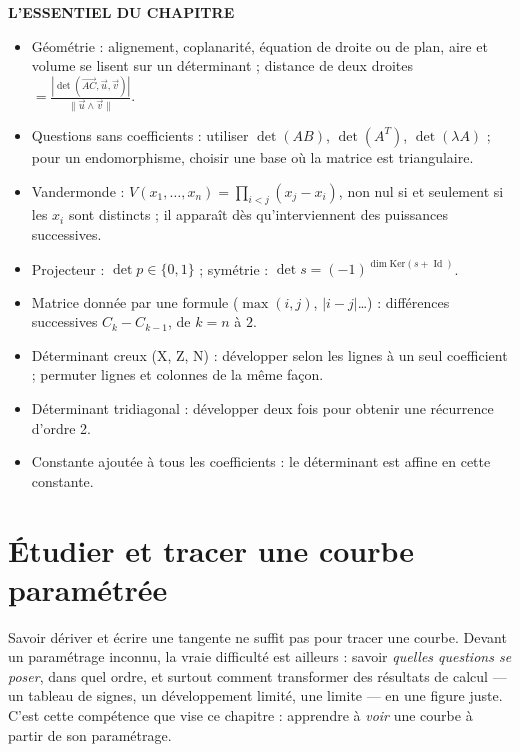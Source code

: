 \documentclass[a4paper,11pt]{article}
\numberwithin{equation}{section}
\numberwithin{figure}{section}
\numberwithin{table}{section}
\theoremstyle{enonce}
\theoremstyle{exemple}
\theoremstyle{remarque}
\newenvironment{essentiel}{\par\needspace{12\baselineskip}\vspace{1.5em}%
  \begin{tcolorbox}[enhanced,unbreakable,colback=white,colframe=white,boxrule=0pt,arc=0pt,
   borderline north={1.4pt}{0pt}{Ocre},left=2pt,right=2pt,top=8pt,bottom=4pt]
  {\sffamily\bfseries\color{Ocre}L'ESSENTIEL DU CHAPITRE}\par\medskip}{\end{tcolorbox}}
\newcommand{\Id}{\operatorname{Id}}
\newcommand{\vv}[1]{\overrightarrow{#1}}
\newcommand{\ve}[1]{\vec{#1}}
\begin{document}
\begin{essentiel}\label{ess:4}
\begin{itemize}
\item Géométrie : alignement, coplanarité, équation de droite ou de plan, aire et volume se lisent sur un déterminant ;
      distance de deux droites $=\frac{|\det(\vv{AC},\ve u,\ve v)|}{\|\ve u\wedge\ve v\|}$.
\item Questions sans coefficients : utiliser $\det(AB)$, $\det(A^T)$, $\det(\lambda A)$ ; pour un endomorphisme, choisir une
      base où la matrice est triangulaire.
\item Vandermonde : $V(x_1,\dots,x_n)=\prod_{i<j}(x_j-x_i)$, non nul si et seulement si les $x_i$ sont distincts ; il
      apparaît dès qu'interviennent des puissances successives.
\item Projecteur : $\det p\in\{0,1\}$ ; symétrie : $\det s=(-1)^{\dim\mathrm{Ker}(s+\Id)}$.
\item Matrice donnée par une formule ($\max(i,j)$, $|i-j|$\dots) : différences successives $C_k-C_{k-1}$, de $k=n$ à $2$.
\item Déterminant creux (X, Z, N) : développer selon les lignes à un seul coefficient ; permuter lignes et colonnes de la même façon.
\item Déterminant tridiagonal : développer deux fois pour obtenir une récurrence d'ordre 2.
\item Constante ajoutée à tous les coefficients : le déterminant est affine en cette constante.
\end{itemize}
\end{essentiel}

\clearpage
\section{Étudier et tracer une courbe paramétrée}\label{sec:seance2}

Savoir dériver et écrire une tangente ne suffit pas pour tracer une courbe. Devant un paramétrage inconnu, la vraie
difficulté est ailleurs : savoir \emph{quelles questions se poser}, dans quel ordre, et surtout comment transformer des
résultats de calcul --- un tableau de signes, un développement limité, une limite --- en une figure juste. C'est cette
compétence que vise ce chapitre : apprendre à \emph{voir} une courbe à partir de son paramétrage.
\end{document}
